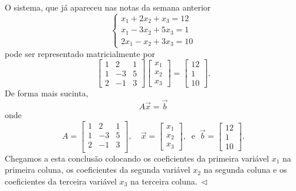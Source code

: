 \documentclass[../livro.tex]{subfiles}  %
\begin{document}
\begin{example}\label{example1}
O sistema, que já apareceu nas notas da semana anterior
\begin{equation}
\left\{
  \begin{array}{ll}
    x_1 + 2x_2 + x_3 = 12 \\
    x_1 -3x_2 + 5x_3 = 1 \\
    2x_1 - x_2 + 3x_3 = 10
  \end{array}
\right.
\end{equation} pode ser representado matricialmente por
\begin{equation}
\left[
  \begin{array}{ccc}
    1 &  2 & 1  \\
    1 & -3 & 5  \\
    2 & -1 & 3
  \end{array}
\right]
\left[
  \begin{array}{c}
    x_1   \\
    x_2  \\
    x_3
  \end{array}
\right] =
\left[
  \begin{array}{c}
    12   \\
    1  \\
    10
  \end{array}
\right].
\end{equation} De forma mais sucinta,
\begin{equation}
\boxed{A \vec{x} = \vec{b}}
\end{equation} onde
\begin{equation}
A = \left[
  \begin{array}{ccc}
    1 &  2 & 1  \\
    1 & -3 & 5  \\
    2 & -1 & 3  \\
  \end{array}
\right], \quad
\vec{x} = \left[
  \begin{array}{c}
    x_1   \\
    x_2  \\
    x_3
  \end{array}
\right], \ \text{ e } \
\vec{b} = \left[
  \begin{array}{c}
    12   \\
    1  \\
    10
  \end{array}
\right].
\end{equation} Chegamos a esta conclusão colocando os coeficientes da primeira variável $x_1$ na primeira coluna, os coeficientes da segunda variável $x_2$ na segunda coluna e os coeficientes da terceira variável $x_3$ na terceira coluna$. \ \lhd$
\end{example}
\end{document}
